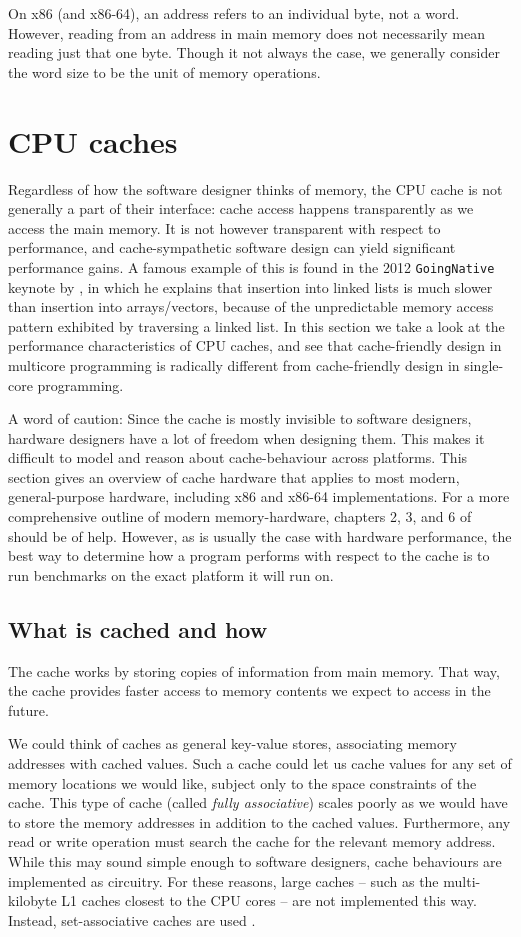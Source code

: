 On x86 (and x86-64), an address refers to an individual byte, not a word. However,
reading from an address in main memory does not necessarily mean reading just
that one byte. Though it not always the case, we generally consider the word
size to be the unit of memory operations.

\section{CPU caches}
Regardless of how the software designer thinks of memory, the CPU cache is not
generally a part of their interface: cache access happens transparently as we
access the main memory. It is not however transparent with
respect to performance, and cache-sympathetic software design can yield
significant performance gains. A famous example of this is found in the 2012
\texttt{GoingNative} keynote by \citeauthor{stroustrup} \cite{stroustrup}, in
which he explains that insertion into linked lists is much slower than
insertion into arrays/vectors, because of the unpredictable memory access
pattern exhibited by traversing a linked list. In this section we take a look
at the performance characteristics of CPU caches, and see that cache-friendly
design in multicore programming is radically different from cache-friendly
design in single-core programming.

A word of caution:
Since the cache is mostly invisible to software designers, hardware designers
have a lot of freedom when designing them. This makes it difficult to model and
reason about cache-behaviour across platforms. This section gives an overview
of cache hardware that applies to most modern, general-purpose hardware,
including x86 and x86-64 implementations. For a more comprehensive outline of
modern memory-hardware, chapters 2, 3, and 6 of
\cite{whatprogrammersshouldknow} should be of help. However, as is usually the
case with hardware performance, the best way to determine how a program
performs with respect to the cache is to run benchmarks on the exact platform
it will run on.

\subsection{What is cached and how} The cache works by storing copies
of information from main memory. That way, the cache provides faster access to
memory contents we expect to access in the future.

We could think of caches as general key-value stores, associating memory
addresses with cached values. Such a cache could let us cache values for any
set of memory locations we would like, subject only to the space constraints of
the cache. This type of cache (called \textit{fully associative}) scales
poorly as we would have to store the memory addresses in addition to the cached
values. Furthermore, any read or write operation must search the cache for the
relevant memory address. While this may sound simple enough to software
designers, cache behaviours are implemented as circuitry. For these reasons,
large caches -- such as the multi-kilobyte L1 caches closest to the CPU cores
-- are not implemented this way. Instead, set-associative caches are used
\cite{whatprogrammersshouldknow} \cite{mckenny-barriers}.

